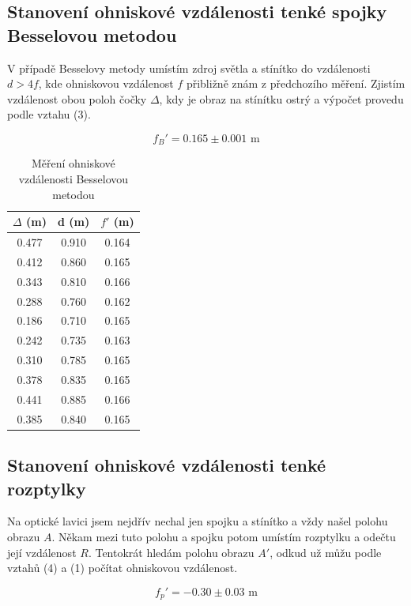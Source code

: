 \documentclass[a4paper,11pt]{article}
\begin{document}
\subsection{Stanovení ohniskové vzdálenosti tenké spojky Besselovou metodou}

V případě Besselovy metody umístím zdroj světla a stínítko do vzdálenosti $ d > 4f $, kde ohniskovou vzdálenost $ f $ přibližně znám z předchozího měření. Zjistím vzdálenost obou poloh čočky $ \Delta $, kdy je obraz na stínítku ostrý a výpočet provedu podle vztahu (3).

\begin{equation}
f_B' = 0.165 \pm 0.001 \text{ m}
\end{equation}

\begin{table}[htpb]
    \centering
    \begin{tabular}{cc | c}
        $ \Delta $ (m) & d (m) & $ f' $ (m)  \\ \hline
        0.477 & 0.910 & 0.164 \\
        0.412 & 0.860 & 0.165 \\
        0.343 & 0.810 & 0.166 \\
        0.288 & 0.760 & 0.162 \\
        0.186 & 0.710 & 0.165 \\
        0.242 & 0.735 & 0.163 \\
        0.310 & 0.785 & 0.165 \\
        0.378 & 0.835 & 0.165 \\
        0.441 & 0.885 & 0.166 \\
        0.385 & 0.840 & 0.165 \\
    \end{tabular}
    \caption{Měření ohniskové vzdálenosti Besselovou metodou}
\end{table}

\subsection{Stanovení ohniskové vzdálenosti tenké rozptylky}

Na optické lavici jsem nejdřív nechal jen spojku a stínítko a vždy našel polohu obrazu $ A $. Někam mezi tuto polohu a spojku potom umístím rozptylku a odečtu její vzdálenost $ R $. Tentokrát hledám polohu obrazu $ A' $, odkud už můžu podle vztahů (4) a (1) počítat ohniskovou vzdálenost.

\begin{equation*}
f_p' = -0.30 \pm 0.03 \text{ m}
\end{equation*}
\end{document}

